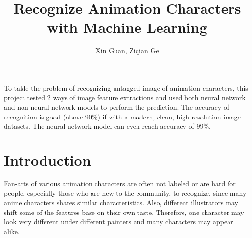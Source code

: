 \documentclass[11.5pt]{article}
\title{Recognize Animation Characters with Machine Learning}
\author{Xin Guan, Ziqian Ge}
\date{}
\begin{document}
    \maketitle

    \abstract
    To takle the problem of recognizing untagged image of animation characters, this project tested 2 ways of image feature extractions and used both neural network and non-neural-network models to perform the prediction. The accuracy of recognition is good (above 90\%) if with a modern, clean, high-resolution image datasets. The neural-network model can even reach accuracy of 99\%.


    \vspace{2mm}


    \section{Introduction}
    Fan-arts of various animation characters are often not labeled or are hard for people, especially those who are new to the community, to recognize, since many anime characters shares similar characteristics. Also, different illustrators may shift some of the features base on their own taste. Therefore, one character may look very different under different painters and many characters may appear alike.
\end{document}
